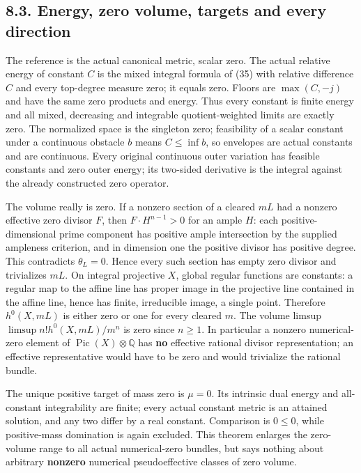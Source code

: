 \documentclass[
  10pt,
]{article}
\begin{document}
\subsection{8.3. Energy, zero volume, targets and every
direction}\label{energy-zero-volume-targets-and-every-direction}

The reference is the actual canonical metric, scalar zero. The actual
relative energy of constant \(C\) is the mixed integral formula of (35)
with relative difference \(C\) and every top-degree measure zero; it
equals zero. Floors are \(\max(C,-j)\) and have the same zero products
and energy. Thus every constant is finite energy and all mixed,
decreasing and integrable quotient-weighted limits are exactly zero. The
normalized space is the singleton zero; feasibility of a scalar constant
under a continuous obstacle \(b\) means \(C\leq\inf b\), so envelopes
are actual constants and are continuous. Every original continuous outer
variation has feasible constants and zero outer energy; its two-sided
derivative is the integral against the already constructed zero
operator.

The volume really is zero. If a nonzero section of a cleared \(mL\) had
a nonzero effective zero divisor \(F\), then \(F\cdot H^{n-1}>0\) for an
ample \(H\): each positive-dimensional prime component has positive
ample intersection by the supplied ampleness criterion, and in dimension
one the positive divisor has positive degree. This contradicts
\(\theta_L=0\). Hence every such section has empty zero divisor and
trivializes \(mL\). On integral projective \(X\), global regular
functions are constants: a regular map to the affine line has proper
image in the projective line contained in the affine line, hence has
finite, irreducible image, a single point. Therefore \(h^0(X,mL)\) is
either zero or one for every cleared \(m\). The volume limsup
\(\limsup n!h^0(X,mL)/m^n\) is zero since \(n\geq1\). In particular a
nonzero numerical-zero element of
\(\operatorname{Pic}(X)\otimes\mathbb Q\) has \textbf{no} effective
rational divisor representation; an effective representative would have
to be zero and would trivialize the rational bundle.

The unique positive target of mass zero is \(\mu=0\). Its intrinsic dual
energy and all-constant integrability are finite; every actual constant
metric is an attained solution, and any two differ by a real constant.
Comparison is \(0\leq0\), while positive-mass domination is again
excluded. This theorem enlarges the zero-volume range to all actual
numerical-zero bundles, but says nothing about arbitrary
\textbf{nonzero} numerical pseudoeffective classes of zero volume.
\end{document}
